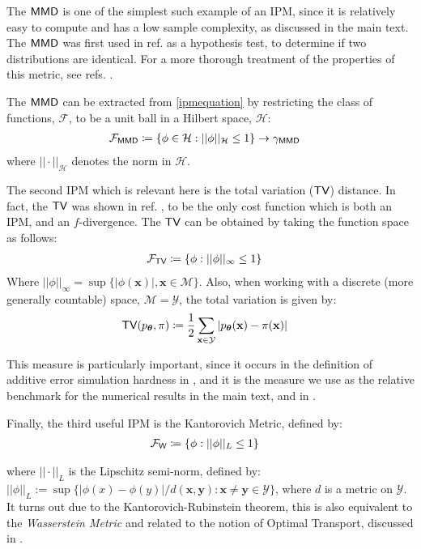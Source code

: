 The $\operatorname{\textsf{MMD}}$ is one of the simplest such example of an IPM, since it is relatively easy to compute and has a low sample complexity, as discussed in the main text. The $\operatorname{\textsf{MMD}}$ was first used in ref. as a hypothesis test, to determine if two distributions are identical. For a more thorough treatment of the properties of this metric, see refs. .  

The $\operatorname{\textsf{MMD}}$ can be extracted from \eqref{ipmequation} by restricting the class of functions, $\mathcal{F}$, to be a unit ball in a Hilbert space, $\mathcal{H}$:
\begin{align}
\mathcal{F}_{\operatorname{\textsf{MMD}}} &  \coloneqq \{\phi \in \mathcal{H}: ||\phi||_{\mathcal{H}}\leq 1\} \rightarrow \gamma_{\operatorname{\textsf{MMD}}} \label{mmd_metric_supp}
\end{align}
where $||\cdot||_{\mathcal{H}}$ denotes the norm in $\mathcal{H}$.

The second IPM which is relevant here is the total variation ($\operatorname{\textsf{TV}}$) distance. In fact, the $\operatorname{\textsf{TV}}$ was shown in ref. , to be the only cost function which is both an IPM, and an $f$-divergence. The $\operatorname{\textsf{TV}}$ can be obtained by taking the function space as follows:
\begin{align}
    \mathcal{F}_{\operatorname{\textsf{TV}}} &  \coloneqq \{\phi: ||\phi||_{\infty} \leq 1\} \label{totalvariationfunctions}
\end{align}
Where $||\phi||_{\infty} = \sup\{|\phi(\mathbf{x})|, \mathbf{x} \in \mathcal{M}\}$. Also, when working with a discrete (more generally countable) space, $\mathcal{M} = \mathcal{Y}$, the total variation is given by:
\begin{align}
\operatorname{\textsf{TV}}(p_{\boldsymbol\theta}, \pi) &  \coloneqq  \frac{1}{2}\sum\limits_{\mathbf{x} \in \mathcal{Y}}|p_{\boldsymbol\theta}(\mathbf{x})- \pi(\mathbf{x})| \label{discretetotalvariation}
\end{align}

This measure is particularly important, since it occurs in the definition of additive error simulation hardness in , and it is the measure we use as the relative benchmark for the numerical results in the main text, and in .

Finally, the third useful IPM is the Kantorovich Metric, defined by:
\begin{align}
    \mathcal{F}_{\operatorname{\textsf{W}}} &  \coloneqq \{\phi: ||\phi||_{L} \leq 1\} \label{kantorovichmetric}
\end{align}


where $||\cdot||_{L}$ is the Lipschitz semi-norm, defined by: $||\phi||_{L} := \sup\{|\phi(x) - \phi(y)|/d(\mathbf{x}, \mathbf{y}) : \mathbf{x} \neq \mathbf{y} \in \mathcal{Y}\}$, where $d$ is a metric on $\mathcal{Y}$. It turns out due to the Kantorovich-Rubinstein theorem, this is also equivalent to the \textit{Wasserstein Metric} and related to the notion of Optimal Transport, discussed in .

